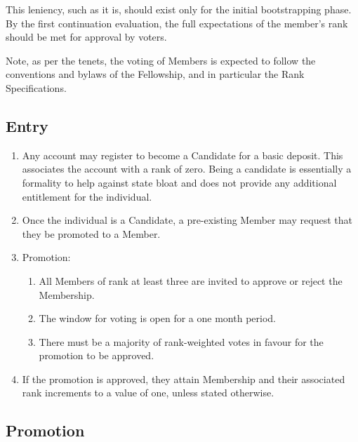 \documentclass[9pt,oneside]{amsart}
\begin{document}
This leniency, such as it is, should exist only for the initial bootstrapping phase. By the first continuation evaluation, the full expectations of the member's rank should be met for approval by voters.

Note, as per the tenets, the voting of Members is expected to follow the conventions and bylaws of the Fellowship, and in particular the Rank Specifications.

\subsection{Entry}

\begin{enumerate}
\item Any account may register to become a Candidate for a basic deposit. This associates the account with a rank of zero. Being a candidate is essentially a formality to help against state bloat and does not provide any additional entitlement for the individual.
\item Once the individual is a Candidate, a pre-existing Member may request that they be promoted to a Member.
\item Promotion:
  \begin{enumerate}
    \item All Members of rank at least three are invited to approve or reject the Membership.
    \item The window for voting is open for a one month period.
    \item There must be a majority of rank-weighted votes in favour for the promotion to be approved.
  \end{enumerate}
\item If the promotion is approved, they attain Membership and their associated rank increments to a value of one, unless stated otherwise.
\end{enumerate}

\subsection{Promotion}
\end{document}
